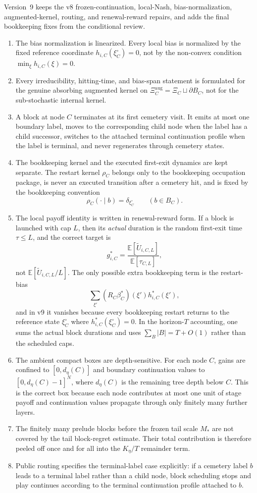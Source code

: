 \documentclass[12pt]{article}
\theoremstyle{definition}
\newcommand{\E}{\mathbb{E}}
\newcommand{\1}{\mathbf{1}}
\begin{document}
Version~9 keeps the v8 frozen-continuation, local-Nash, bias-normalization,
augmented-kernel, routing, and renewal-reward repairs, and adds the final
bookkeeping fixes from the conditional review.

\begin{enumerate}[label=\textnormal{(\arabic*)},leftmargin=2.4em]
\item The bias normalization is linearized. Every local bias is normalized by the
fixed reference coordinate $h_{i,C}(\xi_C^\circ)=0$, not by the non-convex
condition $\min_\xi h_{i,C}(\xi)=0$.
\item Every irreducibility, hitting-time, and bias-span statement is formulated
for the genuine absorbing augmented kernel on
$\Xi_C^{\mathrm{aug}}=\Xi_C\sqcup\partial B_C$, not for the sub-stochastic
internal kernel.
\item A block at node $C$ terminates at its first cemetery visit. It emits at
most one boundary label, moves to the corresponding child node when the label
has a child successor, switches to the attached terminal continuation profile
when the label is terminal, and never regenerates through cemetery states.
\item The bookkeeping kernel and the executed first-exit dynamics are kept
separate. The restart kernel $\rho_C$ belongs only to the bookkeeping occupation
package, is never an executed transition after a cemetery hit, and is fixed by
the bookkeeping convention
\[
\rho_C(\cdot\mid b)=\delta_{\xi_C^\circ}
\qquad (b\in B_C).
\]
\item The local payoff identity is written in renewal-reward form. If a block is
launched with cap $L$, then its \emph{actual} duration is the random first-exit
time $\tau\le L$, and the correct target is
\[
g_{i,C}^*
=
\frac{\E[\widetilde U_{i,C,L}]}{\E[\tau_{C,L}]},
\]
not $\E[\widetilde U_{i,C,L}/L]$. The only possible extra bookkeeping term is the
restart-bias
\[
\sum_{\xi'}(R_C\beta_C^*)(\xi')h_{i,C}^*(\xi'),
\]
and in v9 it vanishes because every bookkeeping restart returns to the reference
state $\xi_C^\circ$ where $h_{i,C}^*(\xi_C^\circ)=0$. In the horizon-$T$
accounting, one sums the actual block durations and uses
$\sum_B |B| = T + O(1)$ rather than the scheduled caps.
\item The ambient compact boxes are depth-sensitive. For each node $C$, gains are
confined to $[0,d_\eta(C)]$ and boundary continuation values to
$[0,d_\eta(C)-1]^N$, where $d_\eta(C)$ is the remaining tree depth below $C$.
This is the correct box because each node contributes at most one unit of stage
payoff and continuation values propagate through only finitely many further
layers.
\item The finitely many prelude blocks before the frozen tail scale $M_*$ are not
covered by the tail block-regret estimate. Their total contribution is therefore
peeled off once and for all into the $K_\eta/T$ remainder term.
\item Public routing specifies the terminal-label case explicitly: if a cemetery
label $b$ leads to a terminal label rather than a child node, block scheduling
stops and play continues according to the terminal continuation profile attached
to $b$.
\end{enumerate}
\end{document}
